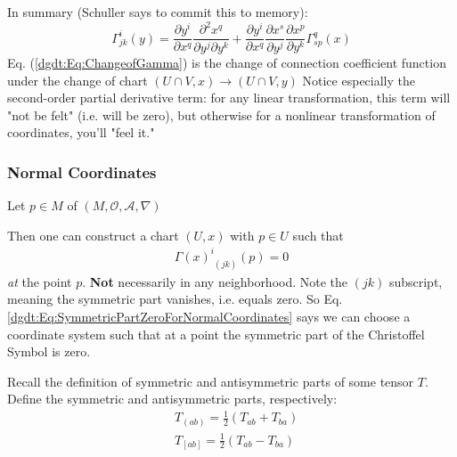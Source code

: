 In summary (Schuller says to commit this to memory):
\begin{equation}\label{dgdt:Eq:ChangeofGamma}
	\boxed{ \Gamma^i_{jk}(y) = \frac{ \partial y^i}{ \partial x^q} \frac{ \partial^2 x^q}{ \partial y^j \partial y^k} + \frac{ \partial y^i}{ \partial x^q } \frac{ \partial x^s }{ \partial y^j} \frac{ \partial x^p }{ \partial y^k} \Gamma^q_{sp}(x) }
\end{equation}
Eq. (\ref{dgdt:Eq:ChangeofGamma}) is the change of connection coefficient function under the change of chart $(U\cap V,x) \to (U\cap V,y)$ Notice especially the second-order partial derivative term: for any linear transformation, this term will "not be felt" (i.e. will be zero), but otherwise for a nonlinear transformation of coordinates, you'll "feel it."


\subsubsection{Normal Coordinates}

Let $p \in M$ of $(M, \mathcal{O}, \mathcal{A}, \nabla)$

Then one can construct a chart $(U,x)$ with $p\in U$ such that 
\begin{equation}\label{dgdt:Eq:SymmetricPartZeroForNormalCoordinates}
\begin{gathered}
	\Gamma(x)^i_{\,\, (jk)}(p) = 0
\end{gathered} 
\end{equation}
\emph{at} the point $p$. \textbf{Not} necessarily in any neighborhood. Note the $(jk)$ subscript, meaning the symmetric part vanishes, i.e. equals zero. So Eq. \ref{dgdt:Eq:SymmetricPartZeroForNormalCoordinates} says we can choose a coordinate system such that at a point the symmetric part of the Christoffel Symbol is zero.

Recall the definition of symmetric and antisymmetric parts of some tensor $T$. Define the symmetric and antisymmetric parts, respectively:
\[
\begin{aligned}
	& T_{(ab)} = \frac{1}{2} ( T_{ab} + T_{ba}) \\
	& T_{[ab]} = \frac{1}{2} ( T_{ab} - T_{ba}) \\
\end{aligned}
\]

